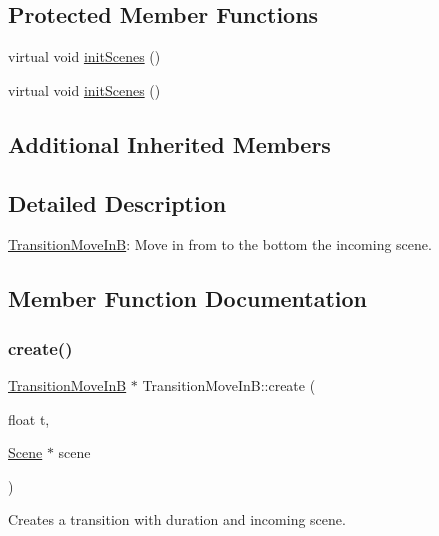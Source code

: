\subsection*{Protected Member Functions}
\begin{DoxyCompactItemize}
\item 
virtual void \hyperlink{classTransitionMoveInB_a3e86144d89423882fd847ee5e7e9b4ac}{init\+Scenes} ()
\item 
virtual void \hyperlink{classTransitionMoveInB_ad262522b11cb2c360964857393316437}{init\+Scenes} ()
\end{DoxyCompactItemize}
\subsection*{Additional Inherited Members}


\subsection{Detailed Description}
\hyperlink{classTransitionMoveInB}{Transition\+Move\+InB}\+: Move in from to the bottom the incoming scene. 

\subsection{Member Function Documentation}
\mbox{\label{classTransitionMoveInB_a2940a32c9c4962f456e72bbdb36d06a8}} 
\subsubsection{\texorpdfstring{create()}{create()}\hspace{0.1cm}{\footnotesize\ttfamily [1/2]}}
{\footnotesize\ttfamily \hyperlink{classTransitionMoveInB}{Transition\+Move\+InB} $\ast$ Transition\+Move\+In\+B\+::create (\begin{DoxyParamCaption}\item[{float}]{t,  }\item[{\hyperlink{classScene}{Scene} $\ast$}]{scene }\end{DoxyParamCaption})\hspace{0.3cm}{\ttfamily [static]}}

Creates a transition with duration and incoming scene.


